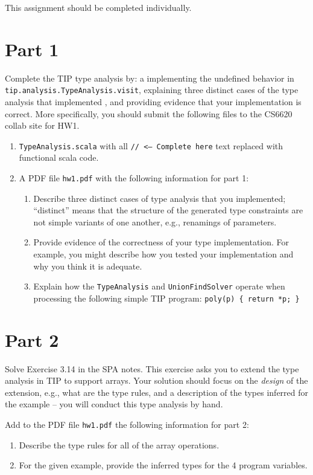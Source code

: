 \documentclass[12pt,letterpaper]{article}
\begin{document}
This assignment should be completed individually.

\section*{Part 1}
Complete the TIP type analysis by: a implementing the undefined behavior in\\
\texttt{tip.analysis.TypeAnalysis.visit}, explaining three distinct cases of the type analysis that implemented , and providing evidence that your implementation is correct.  More specifically, you should submit the following files to the CS6620 collab site for HW1.
\begin{enumerate}
\item \texttt{TypeAnalysis.scala} with all \texttt{// <--- Complete here} text replaced with functional scala code.
\item A PDF file \texttt{hw1.pdf} with the following information for part 1: 
\begin{enumerate}
\item Describe three distinct cases of type analysis that you implemented; ``distinct'' means that the structure of the generated type constraints are not simple variants of one another, e.g., renamings of parameters. 
\item Provide evidence of the correctness of your type implementation.  For example, you might describe how you tested your implementation and why you think it is adequate.
\item Explain how the \texttt{TypeAnalysis} and \texttt{UnionFindSolver} operate
when processing the following simple TIP program: \texttt{poly(p) \{ return *p; \}}
\end{enumerate}
\end{enumerate}

\section*{Part 2}
Solve Exercise 3.14 in the SPA notes.  This exercise asks you to 
extend the type analysis in TIP to support arrays.   Your solution
should focus on the \textit{design} of the extension, e.g., what 
are the type rules, and a description of the types inferred for the
example -- you will conduct this type analysis by hand.

Add to the PDF file \texttt{hw1.pdf} the following information for part 2: 
\begin{enumerate}
\item Describe the type rules for all of the array operations.
\item For the given example, provide the inferred types for the 4 program variables.
\end{enumerate}
\end{document}

